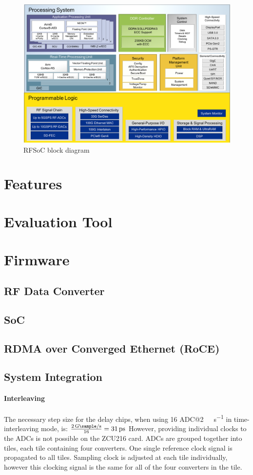 \begin{figure}[tbh]
	\centering
	\includegraphics[width = \textwidth]{chap/04-work/img/rfsoc_blockdiagram}
	\caption{RFSoC block diagram}
	\label{fig:rfsoc}
\end{figure}

\section{Features}
\section{Evaluation Tool}

\section{Firmware}
\subsection{RF Data Converter}
\subsection{SoC}
\subsection{RDMA over Converged Ethernet (RoCE)}

\subsection{System Integration}
\paragraph{Interleaving}
The necessary step size for the delay chips, when using 16 ADC@\SI{2}{\giga \sample \per \second} in time-interleaving mode, is: $\frac{\SI{2}{\giga \sample \per \second}}{16} = \SI{31}{\pico \second}$
However, providing individual clocks to the ADCs is not possible on the ZCU216 card. ADCs are grouped together into tiles, each tile containing four converters. One single reference clock signal is propagated to all tiles. Sampling clock is adjusted at each tile individually, however this clocking signal is the same for all of the four converters in the tile.

